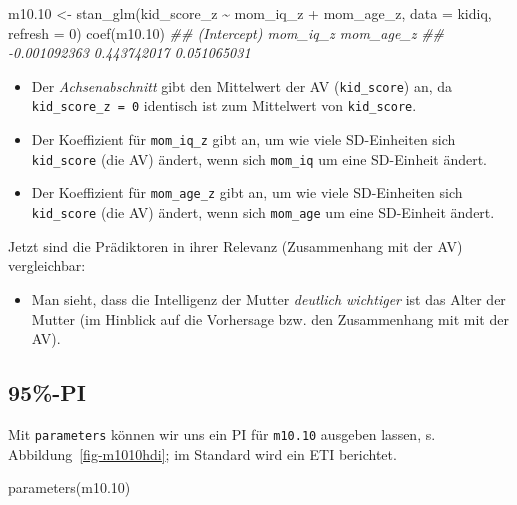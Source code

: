 \documentclass[
  a4paper,
  DIV=11]{scrreprt}
\newenvironment{Shaded}{\begin{snugshade}}{\end{snugshade}}
\newcommand{\AttributeTok}[1]{\textcolor[rgb]{0.40,0.45,0.13}{#1}}
\newcommand{\DecValTok}[1]{\textcolor[rgb]{0.68,0.00,0.00}{#1}}
\newcommand{\DocumentationTok}[1]{\textcolor[rgb]{0.37,0.37,0.37}{\textit{#1}}}
\newcommand{\FloatTok}[1]{\textcolor[rgb]{0.68,0.00,0.00}{#1}}
\newcommand{\FunctionTok}[1]{\textcolor[rgb]{0.28,0.35,0.67}{#1}}
\newcommand{\NormalTok}[1]{\textcolor[rgb]{0.00,0.23,0.31}{#1}}
\newcommand{\OtherTok}[1]{\textcolor[rgb]{0.00,0.23,0.31}{#1}}
\newcommand{\SpecialCharTok}[1]{\textcolor[rgb]{0.37,0.37,0.37}{#1}}
\providecommand{\tightlist}{%
  \setlength{\itemsep}{0pt}\setlength{\parskip}{0pt}}\usepackage{longtable,booktabs,array}
\theoremstyle{definition}
\theoremstyle{remark}
\begin{document}
\begin{Shaded}
\begin{Highlighting}[]
\NormalTok{m10}\FloatTok{.10} \OtherTok{\textless{}{-}} \FunctionTok{stan\_glm}\NormalTok{(kid\_score\_z }\SpecialCharTok{\textasciitilde{}}\NormalTok{ mom\_iq\_z }\SpecialCharTok{+}\NormalTok{ mom\_age\_z, }
                   \AttributeTok{data =}\NormalTok{ kidiq, }
                   \AttributeTok{refresh =} \DecValTok{0}\NormalTok{)}
\FunctionTok{coef}\NormalTok{(m10}\FloatTok{.10}\NormalTok{)}
\DocumentationTok{\#\#  (Intercept)     mom\_iq\_z    mom\_age\_z }
\DocumentationTok{\#\# {-}0.001092363  0.443742017  0.051065031}
\end{Highlighting}
\end{Shaded}

\begin{itemize}
\tightlist
\item
  Der \emph{Achsenabschnitt} gibt den Mittelwert der AV
  (\texttt{kid\_score}) an, da \texttt{kid\_score\_z\ =\ 0} identisch
  ist zum Mittelwert von \texttt{kid\_score}.
\item
  Der Koeffizient für \texttt{mom\_iq\_z} gibt an, um wie viele
  SD-Einheiten sich \texttt{kid\_score} (die AV) ändert, wenn sich
  \texttt{mom\_iq} um eine SD-Einheit ändert.
\item
  Der Koeffizient für \texttt{mom\_age\_z} gibt an, um wie viele
  SD-Einheiten sich \texttt{kid\_score} (die AV) ändert, wenn sich
  \texttt{mom\_age} um eine SD-Einheit ändert.
\end{itemize}

Jetzt sind die Prädiktoren in ihrer Relevanz (Zusammenhang mit der AV)
vergleichbar:

\begin{itemize}
\tightlist
\item
  Man sieht, dass die Intelligenz der Mutter \emph{deutlich wichtiger}
  ist das Alter der Mutter (im Hinblick auf die Vorhersage bzw. den
  Zusammenhang mit mit der AV).
\end{itemize}

\hypertarget{pi}{%
\subsection{95\%-PI}\label{pi}}

Mit \texttt{parameters} können wir uns ein PI für \texttt{m10.10}
ausgeben lassen, s. Abbildung~\ref{fig-m1010hdi}; im Standard wird ein
ETI berichtet.

\begin{Shaded}
\begin{Highlighting}[]
\FunctionTok{parameters}\NormalTok{(m10}\FloatTok{.10}\NormalTok{) }
\end{Highlighting}
\end{Shaded}
\end{document}
